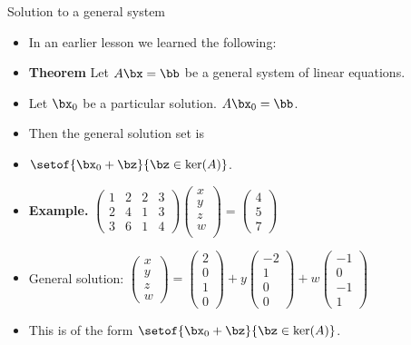 \documentclass{beamer}
\begin{document}
\begin{frame}{Solution to a general system}

\begin{itemize}
\item In an earlier lesson we learned the following:
\item \textbf{Theorem} Let $A\bx=\bb$ be a general system of linear equations.
\item Let $\bx_0$ be a particular solution. $A\bx_0 = \bb$.
\item Then the general solution set is
\item $\setof{\bx_0 + \bz}{\bz\in\ker(A)}$.
\item
\textbf{Example.} $
\begin{pmatrix}
1 & 2 & 2 & 3 \\
2 & 4 & 1 & 3 \\
3 & 6 & 1 & 4
\end{pmatrix}
\begin{pmatrix}
x \\
y \\
z \\
w \\
\end{pmatrix}
=
\begin{pmatrix}
4 \\
5 \\
7
\end{pmatrix}
$
\item
General solution: $
\begin{pmatrix}
x \\ y \\ z \\ w
\end{pmatrix}
=
\begin{pmatrix}
2 \\
0 \\
1 \\
0
\end{pmatrix}
+
y
\begin{pmatrix}
-2 \\
1 \\
0 \\
0
\end{pmatrix}
+
w
\begin{pmatrix}
-1 \\
0 \\
-1 \\
1
\end{pmatrix}
$
\item This is of the form $\setof{\bx_0 + \bz}{\bz\in\ker(A)}$.
\end{itemize}
\end{frame}
\end{document}
